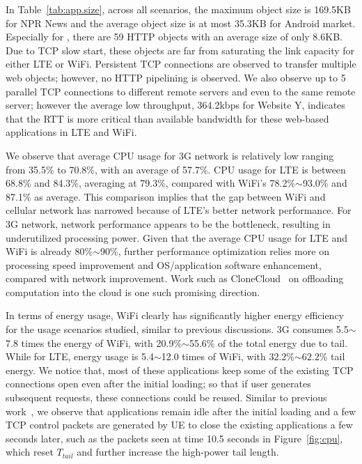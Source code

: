 In Table~\ref{tab:app.size}, across all scenarios, the maximum object size is 169.5KB for NPR News and the average object size is at most 35.3KB for Android market. Especially for \WY, there are 59 HTTP objects with an average size of only 8.6KB. Due to TCP slow start, these objects are far from saturating the link capacity for either LTE or WiFi. Persistent TCP connections are observed to transfer multiple web objects; however, no HTTP pipelining is observed. We also observe up to 5 parallel TCP connections to different remote servers and even to the same remote server; however the average low throughput, \eg 364.2kbps for Website Y, indicates that the RTT is more critical than available bandwidth for these web-based applications in LTE and WiFi.

We observe that average CPU usage for 3G network is relatively low ranging from 35.5\% to 70.8\%, with an average of 57.7\%. CPU usage for LTE is between 68.8\% and 84.3\%, averaging at 79.3\%, compared with WiFi's 78.2\%$\sim$93.0\% and 87.1\% as average. This comparison implies that the gap between WiFi and cellular network has narrowed because of LTE's better network performance. For 3G network, network performance appears to be the bottleneck, resulting in underutilized processing power. Given that the average CPU usage for LTE and WiFi is already 80\%$\sim$90\%, further performance optimization relies more on processing speed improvement and OS/application software enhancement, compared with network improvement. Work such as CloneCloud~\cite{CloneCloud:Eurosys:2011} on offloading computation into the cloud is one such promising direction.

In terms of energy usage, WiFi clearly has significantly higher energy efficiency for the usage scenarios studied, similar to previous discussions. 3G consumes 5.5$\sim$7.8 times the energy of WiFi, with 20.9\%$\sim$55.6\% of the total energy due to tail. While for  LTE, energy usage is 5.4$\sim$12.0 times of WiFi, with 32.2\%$\sim$62.2\% tail energy. We notice that, most of these applications keep some of the existing TCP connections open even after the initial loading; so that if user generates subsequent requests, these connections could be reused. Similar to previous work~\cite{mobisys.aro}, we observe that applications remain idle after the initial loading and a few TCP control packets are generated by UE to close the existing applications a few seconds later, such as the packets seen at time 10.5 seconds in Figure~\ref{fig:cpu}, which reset $T_{tail}$ and further increase the high-power tail length.

